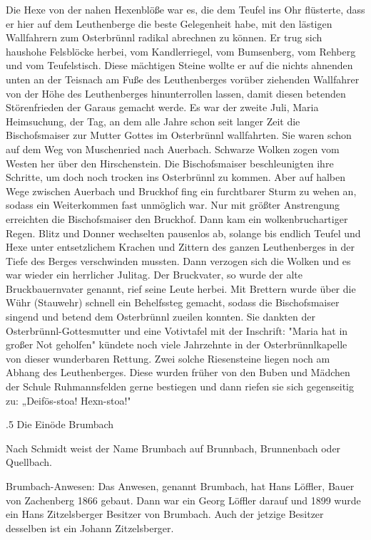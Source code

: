 Die Hexe von der nahen Hexenblöße war es, die dem Teufel ins Ohr flüsterte, dass
er hier auf dem Leuthenberge die beste Gelegenheit habe, mit den lästigen
Wallfahrern zum Osterbrünnl radikal abrechnen zu können. Er trug sich haushohe
Felsblöcke herbei, vom Kandlerriegel, vom Bumsenberg, vom Rehberg und vom
Teufelstisch. Diese mächtigen Steine wollte er auf die nichts ahnenden unten an
der Teisnach am Fuße des Leuthenberges vorüber ziehenden Wallfahrer von der Höhe
des Leuthenberges hinunterrollen lassen, damit diesen betenden Störenfrieden der
Garaus gemacht werde. Es war der zweite Juli, Maria Heimsuchung, der Tag, an dem
alle Jahre schon seit langer Zeit die Bischofsmaiser zur Mutter Gottes im
Osterbrünnl wallfahrten. Sie waren schon auf dem Weg von Muschenried nach
Auerbach. Schwarze Wolken zogen vom Westen her über den Hirschenstein. Die
Bischofsmaiser beschleunigten ihre Schritte, um doch noch trocken ins
Osterbrünnl zu kommen. Aber auf halben Wege zwischen Auerbach und Bruckhof fing
ein furchtbarer Sturm zu wehen an, sodass ein Weiterkommen fast unmöglich war.
Nur mit größter Anstrengung erreichten die Bischofsmaiser den Bruckhof. Dann kam
ein wolkenbruchartiger Regen. Blitz und Donner wechselten pausenlos ab, solange
bis endlich Teufel und Hexe unter entsetzlichem Krachen und Zittern des ganzen
Leuthenberges in der Tiefe des Berges verschwinden mussten. Dann verzogen sich
die Wolken und es war wieder ein herrlicher Julitag. Der Bruckvater, so wurde
der alte Bruckbauernvater genannt, rief seine Leute herbei. Mit Brettern wurde
über die Wühr (Stauwehr) schnell ein Behelfssteg gemacht, sodass die
Bischofsmaiser singend und betend dem Osterbrünnl zueilen konnten. Sie dankten
der Osterbrünnl-Gottesmutter und eine Votivtafel mit der Inschrift: "Maria hat
in großer Not geholfen" kündete noch viele Jahrzehnte in der Osterbrünnlkapelle
von dieser wunderbaren Rettung. Zwei solche Riesensteine liegen noch am Abhang
des Leuthenberges. Diese wurden früher von den Buben und Mädchen der Schule
Ruhmannsfelden gerne bestiegen und dann riefen sie sich gegenseitig zu:
„Deifös-stoa! Hexn-stoa!"



.5 Die Einöde Brumbach

Nach Schmidt weist der Name Brumbach auf Brunnbach, Brunnenbach oder Quellbach.

Brumbach-Anwesen: Das Anwesen, genannt Brumbach, hat Hans Löffler, Bauer von
Zachenberg 1866 gebaut. Dann war ein Georg Löffler darauf und 1899 wurde ein
Hans Zitzelsberger Besitzer von Brumbach. Auch der jetzige Besitzer desselben
ist ein Johann Zitzelsberger.

